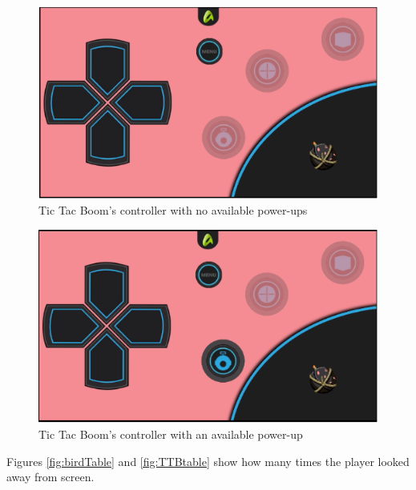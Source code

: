 \begin{figure}
\centering
\includegraphics[width=\textwidth]{figures/TTBcontrol}
\caption{Tic Tac Boom's controller with no available power-ups}\label{fig:TTB1}
\end{figure}

\begin{figure}
\centering
\includegraphics[width=\textwidth]{figures/TTBpowerUp}
\caption{Tic Tac Boom's controller with an available power-up}\label{fig:TTB2}
\end{figure}

Figures \ref{fig:birdTable} and \ref{fig:TTBtable} show how many times the player looked away from screen. 

